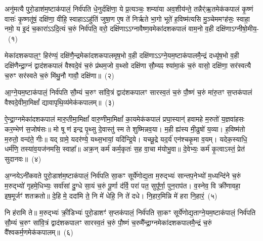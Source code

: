\setcounter{anuvakam}{0}
अनु॑मत्यै पुरो॒डाश॑\-म॒ष्टा\-क॑पालं॒ निर्व॑पति धे॒नुर्दक्षि॑णा॒ ये प्र॒त्यञ्चः॒ शम्या॑या अव॒शीय॑न्ते॒ तन्नैर्॑ऋ॒तमेक॑कपालं कृ॒ष्णं वासः॑ कृ॒ष्णतू॑षं॒ दक्षि॑णा॒ वीहि॒ स्वाहा\-ऽ\-ऽहु॑तिं जुषा॒ण ए॒ष ते॑ निर्\mbox{}ऋते भा॒गो भूते॑ ह॒विष्म॑त्यसि मु॒ञ्चेममꣳह॑सः॒ स्वाहा॒ नमो॒ य इ॒दं च॒कारा॑\-ऽ\-ऽदि॒त्यं च॒रुं निर्व॑पति॒ वरो॒ दक्षि॑णा\-ऽ\-ऽग्नावैष्ण॒वमेका॑\-दश\-कपालं वाम॒नो व॒ही दक्षि॑णा\-ऽग्नीषो॒मीय॒-~(१)

मेका॑\-दश\-कपाल॒ꣳ॒ हिर॑ण्यं॒ दक्षि॑णै॒न्द्रमेका॑\-दश\-कपालमृष॒भो व॒ही दक्षि॑णा\-ऽ\-ऽग्ने॒यम॒ष्टाक॑पालमै॒न्द्रं दध्यृ॑ष॒भो व॒ही दक्षि॑णैन्द्रा॒ग्नं द्वाद॑श\-कपालं वैश्वदे॒वं च॒रुं प्र॑थम॒जो व॒थ्सो दक्षि॑णा सौ॒म्यꣴ श्या॑मा॒कं च॒रुं वासो॒ दक्षि॑णा॒ सर॑स्वत्यै च॒रुꣳ सर॑स्वते च॒रुं मि॑थु॒नौ गावौ॒ दक्षि॑णा॥~(२)

{\anuvakamend[{अ॒ग्नी॒षो॒मीयं॒ चतु॑स्त्रिꣳशच्च}]}%

आ॒ग्ने॒यम॒ष्टा\-क॑पालं॒ निर्व॑पति सौ॒म्यं च॒रुꣳ सा॑वि॒त्रं द्वाद॑श\-कपालꣳ सारस्व॒तं च॒रुं पौ॒ष्णं च॒रुं मा॑रु॒तꣳ स॒प्तक॑पालं वैश्वदे॒वीमा॒मिक्षां᳚ द्यावापृथि॒व्य॑मेक॑कपालम्॥~(३)

{\anuvakamend[{आ॒ग्ने॒यम॒ष्टाद॑श}]}%

ऐ॒न्द्रा॒ग्नमेका॑\-दश\-कपालं मारु॒तीमा॒मिक्षां᳚ वारु॒णीमा॒मिक्षां᳚ का॒यमेक॑कपालं प्रघा॒स्यान्॑ हवामहे म॒रुतो॑ य॒ज्ञवा॑हसः कर॒म्भेण॑ स॒जोष॑सः॥ मो षू ण॑ इन्द्र पृ॒थ्सु दे॒वास्तु॑ स्म ते शुष्मिन्नव॒या। म॒ही ह्य॑स्य मी॒ढुषो॑ य॒व्या। ह॒विष्म॑तो म॒रुतो॒ वन्द॑ते॒ गीः॥ यद् ग्रामे॒ यदर॑ण्ये॒ यथ्स॒भायां॒ यदि॑न्द्रि॒ये। यच्छू॒द्रे यद॒र्य॑ एन॑श्चकृ॒मा व॒यम्। यदेक॒स्याधि॒ धर्म॑णि॒ तस्या॑व॒यज॑नमसि॒ स्वाहा᳚॥ अक्र॒न् कर्म॑ कर्म॒कृतः॑ स॒ह वा॒चा म॑योभु॒वा॥ दे॒वेभ्यः॒ कर्म॑ कृ॒त्वा\-ऽस्तं॒ प्रेत॑ सुदानवः॥~(४)

{\anuvakamend[{व॒यं यद् विꣳ॑श॒तिश्च॑}]}%

अ॒ग्नये\-ऽनी॑कवते पुरो॒डाश॑\-म॒ष्टा\-क॑पालं॒ निर्व॑पति सा॒कꣳ सूर्ये॑णोद्य॒ता म॒रुद्भ्यः॑ सान्तप॒नेभ्यो॑ म॒ध्यन्दि॑ने च॒रुं म॒रुद्भ्यो॑ गृहमे॒धिभ्यः॒ सर्वा॑सां दु॒ग्धे सा॒यं च॒रुं पू॒र्णा द॑र्वि॒ परा॑ पत॒ सुपू᳚र्णा॒ पुन॒राप॑त। व॒स्नेव॒ वि क्री॑णावहा॒ इष॒मूर्जꣳ॑ शतक्रतो॥ दे॒हि मे॒ ददा॑मि ते॒ नि मे॑ धेहि॒ नि ते॑ दधे। नि॒हार॒मिन्नि मे॑ हरा नि॒हारं॒~(५)


नि ह॑रामि ते॥ म॒रुद्भ्यः॑ क्री॒डिभ्यः॑ पुरो॒डाशꣳ॑ स॒प्त\-क॑पालं॒ निर्व॑पति सा॒कꣳ सूर्ये॑णोद्य॒ताग्ने॒यम॒ष्टा\-क॑पालं॒ निर्व॑पति सौ॒म्यं च॒रुꣳ सा॑वि॒त्रं द्वाद॑श\-कपालꣳ सारस्व॒तं च॒रुं पौ॒ष्णं च॒रुमै᳚न्द्रा॒ग्नमेका॑\-दश\-कपालमै॒न्द्रं च॒रुं वै᳚श्वकर्म॒णमेक॑कपालम्॥~(६)

